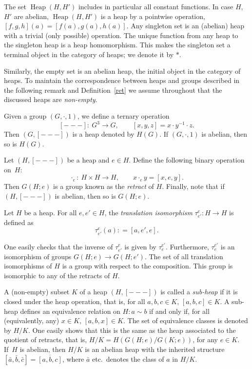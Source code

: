 \documentclass[10pt,a4paper]{amsart}
\numberwithin{equation}{section}
\newcommand{\heap}{\operatorname{Heap}}
\begin{document}
The set $\heap(H,H')$ includes in particular all constant functions.
In case $H$, $H'$ are abelian, $\heap(H,H')$ is a heap by a pointwise operation, $[f,g,h](a) = [f(a),g(a),h(a)]$. Any singleton set is an (abelian) heap with a trivial (only possible) operation. The unique function from any heap to the singleton heap is a heap homomorphism. This makes the singleton set a terminal object in the category of heaps; we denote it by $\ast$.

Similarly, the empty set is an abelian heap, the initial object in the category of heaps. To maintain the correspondence between heaps and groups described in the following remark and Definition~\ref{ret} we assume throughout that the discussed heaps are {\em non-empty}.
\begin{Remark}
Given a group $(G,\cdot,1)$, we define a ternary operation
\[ [---]\colon\ G^3 \rightarrow G, \qquad [x,y,z] = x \cdot y^{-1} \cdot z.\]
 Then $(G,[---])$ is a heap denoted by $H(G)$. If $(G,\cdot,1)$ is abelian, then so is $H(G)$.
\end{Remark}
\begin{Definition} \label{ret}
Let $(H,[---])$ be a heap and $e \in H$. Define the following binary operation on~$H$:
\[\cdot_e \colon\ H \times H \rightarrow H, \qquad x \cdot_e y = [x,e,y]. \]
 Then $G(H;e)$ is a group known as the \textit{retract} of $H$. Finally, note that if $(H,[---])$ is abelian, then so is $G(H;e)$.
\end{Definition}
\begin{Definition}
Let $H$ be a heap. For all $e,e'\in H$, the \textit{translation isomorphism} $\tau^{e}_{e'}\colon H\to H$ is defined as
\[
\tau^{e}_{e'}(a) : = [a,e',e].
\]
\end{Definition}
One easily checks that the inverse of $\tau^{e}_{e'}$ is given by $\tau^{e'}_{e}$. Furthermore, $\tau^{e'}_{e}$ is an isomorphism of groups $G(H;e)\to G(H;e')$. The set of all translation isomorphisms of $H$ is a group with respect to the composition. This group is isomorphic to any of the retracts of $H$.

A (non-empty) subset $K$ of a heap $(H,[---])$ is called a \textit{sub-heap} if it is closed under the heap operation, that is, for all $a,b,c\in K$, $[a,b,c]\in K$. A sub-heap defines an equivalence relation on $H\colon a\sim b$ if and only if, for all (equivalently, any) $x\in K$, $[a,b,x]\in K$. The set of equivalence classes is denoted by $H/K$. One easily shows that this is the same as the heap associated to the quotient of retracts, that is, $H/K = H(G(H;e)/G(K;e))$, for any $e\in K$. If~$H$ is abelian, then $H/K$ is an abelian heap with the inherited structure $[\bar{a},\bar{b},\bar{c}] = \overline{[a,b,c]}$, where $\bar{a}$ etc.\ denotes the class of $a$ in $H/K$.
\end{document}
